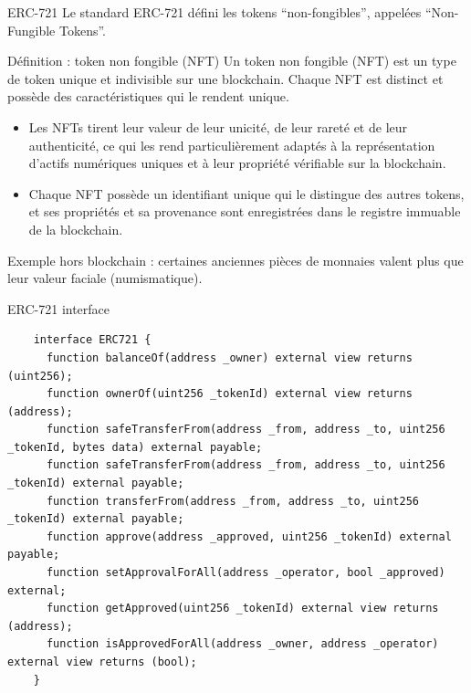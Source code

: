 \begin{frame}{ERC-721}
  Le standard ERC-721 défini les tokens \enquote{non-fongibles}, appelées \enquote{Non-Fungible Tokens}.

  \begin{block}{Définition : token non fongible (NFT)}
    Un token non fongible (NFT) est un type de token unique et indivisible sur une blockchain. Chaque NFT est distinct et possède des caractéristiques qui le rendent unique.

    \begin{itemize}
      \item Les NFTs tirent leur valeur de leur unicité, de leur rareté et de leur authenticité, ce qui les rend particulièrement adaptés à la représentation d'actifs numériques uniques et à leur propriété vérifiable sur la blockchain.
      \item Chaque NFT possède un identifiant unique qui le distingue des autres tokens, et ses propriétés et sa provenance sont enregistrées dans le registre immuable de la blockchain.
    \end{itemize}
  \end{block}

  Exemple hors blockchain : certaines anciennes pièces de monnaies valent plus que leur valeur faciale (numismatique).
\end{frame}

\begin{frame}[fragile]{ERC-721 interface}
  \begin{verbatim}
    interface ERC721 {
      function balanceOf(address _owner) external view returns (uint256);
      function ownerOf(uint256 _tokenId) external view returns (address);
      function safeTransferFrom(address _from, address _to, uint256 _tokenId, bytes data) external payable;
      function safeTransferFrom(address _from, address _to, uint256 _tokenId) external payable;
      function transferFrom(address _from, address _to, uint256 _tokenId) external payable;
      function approve(address _approved, uint256 _tokenId) external payable;
      function setApprovalForAll(address _operator, bool _approved) external;
      function getApproved(uint256 _tokenId) external view returns (address);
      function isApprovedForAll(address _owner, address _operator) external view returns (bool);
    }
  \end{verbatim}
\end{frame}

